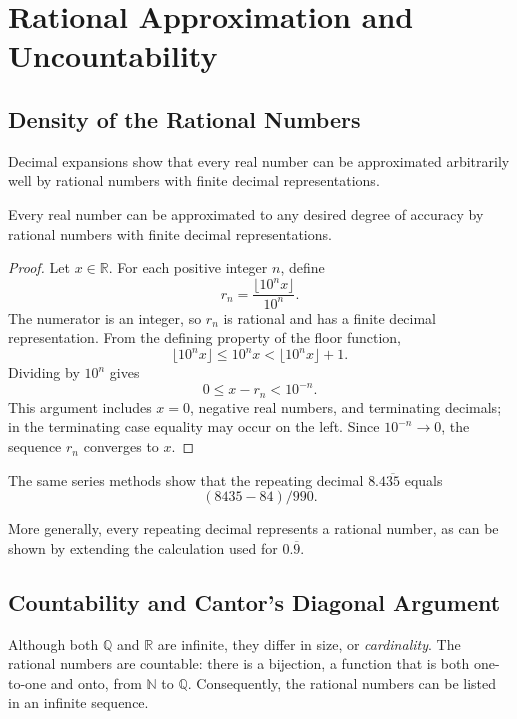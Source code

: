 \section{Rational Approximation and Uncountability}

\subsection{Density of the Rational Numbers}

Decimal expansions show that every real number can be approximated arbitrarily well by rational numbers with finite decimal representations.

\begin{theorem}
Every real number can be approximated to any desired degree of accuracy by rational numbers with finite decimal representations.
\end{theorem}

\begin{proof}
Let $x\in\mathbb{R}$. For each positive integer $n$, define
\[
r_n=\frac{\lfloor 10^n x\rfloor}{10^n}.
\]
The numerator is an integer, so $r_n$ is rational and has a finite
decimal representation. From the defining property of the floor function,
\[
\lfloor 10^n x\rfloor\leq 10^n x<\lfloor 10^n x\rfloor+1.
\]
Dividing by $10^n$ gives
\[
0\leq x-r_n<10^{-n}.
\]
This argument includes $x=0$, negative real numbers, and terminating
decimals; in the terminating case equality may occur on the left. Since
$10^{-n}\to0$, the sequence $r_n$ converges to $x$.
\end{proof}

The same series methods show that the repeating decimal $8.4\overline{35}$ equals
\[
(8435 - 84)/990.
\]

More generally, every repeating decimal represents a rational number, as can be shown by extending the calculation used for $0.\overline{9}$.

\subsection{Countability and Cantor's Diagonal Argument}

Although both $\mathbb{Q}$ and $\mathbb{R}$ are infinite, they differ in size, or \emph{cardinality}.
The rational numbers are countable: there is a bijection, a function that is both one-to-one and onto, from $\mathbb{N}$ to $\mathbb{Q}$.
Consequently, the rational numbers can be listed in an infinite sequence.

